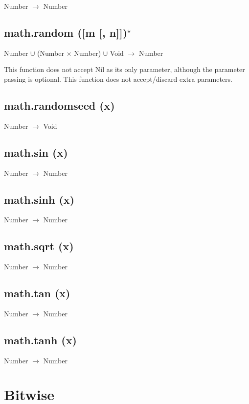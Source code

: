 \documentclass[12pt]{article}
\begin{document}
Number $\rightarrow$ Number

\subsection{math.random ([m [, n]])$^\star$}

Number $\cup$ (Number $\times$ Number) $\cup$ Void $\rightarrow$
Number

This function does not accept Nil as its only parameter,
although the parameter passing is optional.
This function does not accept/discard extra parameters.

\subsection{math.randomseed (x)}

Number $\rightarrow$ Void

\subsection{math.sin (x)}

Number $\rightarrow$ Number

\subsection{math.sinh (x)}

Number $\rightarrow$ Number

\subsection{math.sqrt (x)}

Number $\rightarrow$ Number

\subsection{math.tan (x)}

Number $\rightarrow$ Number

\subsection{math.tanh (x)}

Number $\rightarrow$ Number

\newpage

\section{Bitwise}
\end{document}
